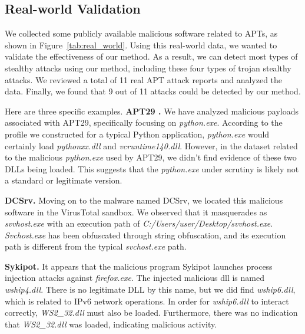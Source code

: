 \subsection{Real-world Validation}
\label{sec-real-world}

We collected some publicly available malicious software related to APTs, as shown in Figure~\ref{tab:real_world}.
Using this real-world data, we wanted to validate the effectiveness of our method. As a result, we can detect most types of stealthy attacks using our method, including these four types of trojan stealthy attacks.
We reviewed a total of 11 real APT attack reports and analyzed the data. Finally, we found that 9 out of 11 attacks could be detected by our method.

Here are three specific examples.
\noindent
{\bf APT29 \cite{mitre_g0016}.}
We have analyzed malicious payloads associated with APT29, specifically focusing on \textit{python.exe}. According to the profile we constructed for a typical Python application, \textit{python.exe} would certainly load \textit{pythonxx.dll} and \textit{vcruntime140.dll}. However, in the dataset related to the malicious \textit{python.exe} used by APT29, we didn't find evidence of these two DLLs being loaded. This suggests that the \textit{python.exe} under scrutiny is likely not a standard or legitimate version.

\noindent
{\bf DCSrv\cite{checkpoint2021}.}
Moving on to the malware named DCSrv, we located this malicious software in the VirusTotal sandbox. We observed that it masquerades as \textit{svvhost.exe} with an execution path of \textit{C:/Users/user/Desktop/svvhost.exe}. \textit{Svchost.exe} has been obfuscated through string obfuscation, and its execution path is different from the typical \textit{svchost.exe} path.

\noindent
{\bf Sykipot\cite{att2023}.}
It appears that the malicious program Sykipot launches process injection attacks against \textit{firefox.exe}. The injected malicious dll is named \textit{wship4.dll}. There is no legitimate DLL by this name, but we did find \textit{wship6.dll}, which is related to IPv6 network operations. In order for \textit{wship6.dll} to interact correctly, \textit{WS2\_32.dll} must also be loaded. Furthermore, there was no indication that \textit{WS2\_32.dll} was loaded, indicating malicious activity.











